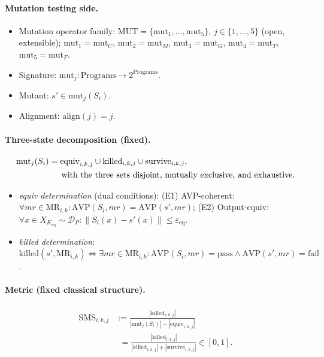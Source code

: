 \documentclass[manuscript,screen,review]{acmart}
\begin{document}
\paragraph{Mutation testing side.}
\begin{itemize}
\item Mutation operator family: $\mathrm{MUT} = \{\mathrm{mut}_1, \ldots, \mathrm{mut}_5\}$, $j \in \{1,\ldots,5\}$ (open, extensible); $\mathrm{mut}_1 = \mathrm{mut}_C$, $\mathrm{mut}_2 = \mathrm{mut}_M$, $\mathrm{mut}_3 = \mathrm{mut}_G$, $\mathrm{mut}_4 = \mathrm{mut}_T$, $\mathrm{mut}_5 = \mathrm{mut}_F$.
\item Signature: $\mathrm{mut}_j : \text{Programs} \to 2^{\text{Programs}}$.
\item Mutant: $s' \in \mathrm{mut}_j(S_i)$.
\item Alignment: $\mathrm{align}(j) = j$.
\end{itemize}

\paragraph{Three-state decomposition (fixed).}
\[
\begin{aligned}
\mathrm{mut}_j(S_i)
  &= \mathrm{equiv}_{i,k,j} \cup \mathrm{killed}_{i,k,j}
     \cup \mathrm{survive}_{i,k,j},\\
&\hspace{1.5em}\text{with the three sets disjoint, mutually exclusive, and exhaustive.}
\end{aligned}
\]
\begin{itemize}
\item \emph{equiv determination} (dual conditions):
  (E1) AVP-coherent: $\forall \mathit{mr} \in \mathrm{MR}_{i,k}: \mathrm{AVP}(S_i, \mathit{mr}) = \mathrm{AVP}(s', \mathit{mr})$;
  (E2) Output-equiv: $\forall x \in X_{K_{\mathrm{eq}}} \sim \mathcal{D}_P: \|S_i(x) - s'(x)\| \leq \varepsilon_{\mathrm{eq}}$.
\item \emph{killed determination}: $\mathrm{killed}(s', \mathrm{MR}_{i,k}) \Leftrightarrow \exists \mathit{mr} \in \mathrm{MR}_{i,k}: \mathrm{AVP}(S_i, \mathit{mr}) = \text{pass} \wedge \mathrm{AVP}(s', \mathit{mr}) = \text{fail}$.
\end{itemize}

\paragraph{Metric (fixed classical structure).}
\begin{align*}
\mathrm{SMS}_{i,k,j} &:= \frac{|\mathrm{killed}_{i,k,j}|}{|\mathrm{mut}_j(S_i)| - |\mathrm{equiv}_{i,k,j}|} \\
                    &\phantom{:}= \frac{|\mathrm{killed}_{i,k,j}|}{|\mathrm{killed}_{i,k,j}| + |\mathrm{survive}_{i,k,j}|} \in [0, 1].
\end{align*}
\end{document}
